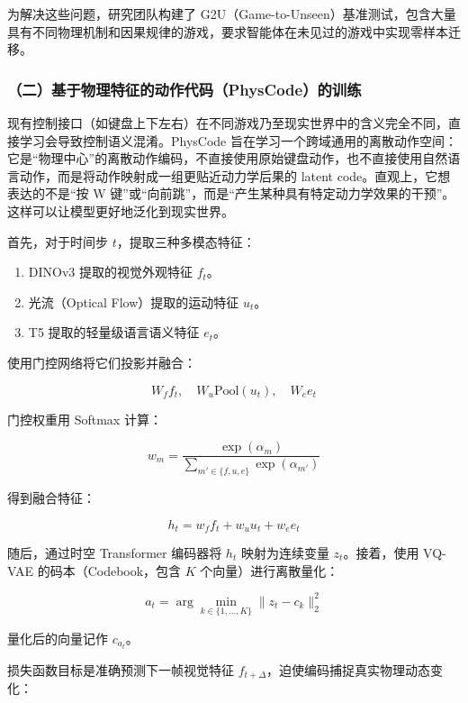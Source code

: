 为解决这些问题，研究团队构建了 G2U（Game-to-Unseen）基准测试，包含大量具有不同物理机制和因果规律的游戏，要求智能体在未见过的游戏中实现零样本迁移。

\hypertarget{ux4e8cux57faux4e8eux7269ux7406ux7279ux5f81ux7684ux52a8ux4f5cux4ee3ux7801physcodeux7684ux8badux7ec3}{%
\subsubsection{（二）基于物理特征的动作代码（PhysCode）的训练}\label{ux4e8cux57faux4e8eux7269ux7406ux7279ux5f81ux7684ux52a8ux4f5cux4ee3ux7801physcodeux7684ux8badux7ec3}}

现有控制接口（如键盘上下左右）在不同游戏乃至现实世界中的含义完全不同，直接学习会导致控制语义混淆。PhysCode 旨在学习一个跨域通用的离散动作空间：它是``物理中心''的离散动作编码，不直接使用原始键盘动作，也不直接使用自然语言动作，而是将动作映射成一组更贴近动力学后果的 latent code。直观上，它想表达的不是``按 W 键''或``向前跳''，而是``产生某种具有特定动力学效果的干预''。这样可以让模型更好地泛化到现实世界。

首先，对于时间步 \(t\)，提取三种多模态特征：

\begin{enumerate}
\def\labelenumi{\arabic{enumi}.}
\tightlist
\item
  DINOv3 提取的视觉外观特征 \(f_t\)。
\item
  光流（Optical Flow）提取的运动特征 \(u_t\)。
\item
  T5 提取的轻量级语言语义特征 \(e_t\)。
\end{enumerate}

使用门控网络将它们投影并融合：

\[
W_f f_t,\quad W_u \mathrm{Pool}(u_t),\quad W_e e_t
\]

门控权重用 Softmax 计算：

\[
 w_m =
\frac{\exp(\alpha_m)}
{\sum_{m' \in \{f,u,e\}} \exp(\alpha_{m'})}
\]

得到融合特征：

\[
h_t = w_f f_t + w_u u_t + w_e e_t
\]

随后，通过时空 Transformer 编码器将 \(h_t\) 映射为连续变量 \(z_t\)。接着，使用 VQ-VAE 的码本（Codebook，包含 \(K\) 个向量）进行离散量化：

\[
a_t
= \arg\min_{k \in \{1,\ldots,K\}}
\lVert z_t - c_k \rVert_2^2
\]

量化后的向量记作 \(c_{a_t}\)。

损失函数目标是准确预测下一帧视觉特征 \(f_{t+\Delta}\)，迫使编码捕捉真实物理动态变化：


